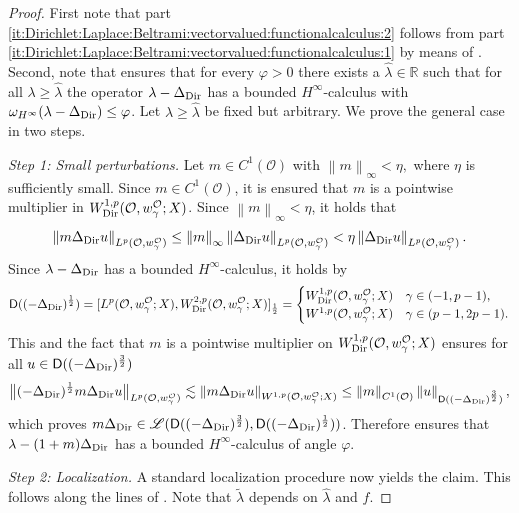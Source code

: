 \documentclass[12pt,a4paper, reqno]{amsart}
\theoremstyle{plain}
\theoremstyle{definition}
\theoremstyle{remark}
\numberwithin{equation}{section}
\newcommand{\1}{\mathbbm{1}}
\newcommand{\R}{\ensuremath{\mathbb{R}}}
\newcommand{\calO}{\ensuremath{\mathcal{O}}}
\newcommand{\sL}{\ensuremath{\mathscr{L}}}
\newcommand{\sfD}{\ensuremath{\mathsf{D}}}
\newcommand{\Dir}{\textup{Dir}}
\newcommand{\nrm}[1]{\left\lVert #1 \right\rVert}
\begin{document}
\begin{proof}
    First note that part \ref{it:Dirichlet:Laplace:Beltrami:vectorvalued:functionalcalculus:2} follows from part \ref{it:Dirichlet:Laplace:Beltrami:vectorvalued:functionalcalculus:1} by means of \cite[Theorem 13.1]{Kunstmann2004}. 
    Second, note that \cite[Theorem 6.1]{LindemulderVeraar2020} ensures that for every $\varphi>0$ there exists a $\hat\lambda\in \R$ such that for all $\lambda\ge \hat\lambda $ the operator $\lambda-\Delta_\Dir$ has a bounded $H^\infty$-calculus with $\omega_{H^\infty}(\lambda-\Delta_\Dir)\le \varphi$.
    Let $\lambda \ge \hat\lambda$ be fixed but arbitrary. 
    We prove the general case in two steps. 

\medskip

   \noindent\emph{Step 1: Small perturbations.} Let $m\in C^1(\calO)$ with $\nrm{m}_\infty<\eta,$ where $\eta$ is sufficiently small. Since $m\in C^1(\calO)$, it is ensured that $m$ is a pointwise multiplier in $W^{1,p}_\Dir(\calO,w_\gamma^\calO;X)$. Since $\nrm{m}_\infty<\eta$, it holds that \begin{equation}\label{Dirichlet:Laplace:Beltrami:vectorvalued:functionalcalculus:proof:1}
        \nrm{m\Delta_\Dir u}_{L^p(\calO,w_\gamma^\calO)}\le \nrm{m}_\infty \nrm{\Delta_\Dir u}_{L^p(\calO,w_\gamma^\calO)}< \eta\nrm{\Delta_\Dir u}_{L^p(\calO,w_\gamma^\calO)}. 
    \end{equation}
        Since $\lambda-\Delta_\Dir$ has a bounded $H^\infty$-calculus, it holds by \cite[Lemma 6.10]{LindemulderVeraar2020} 
        \[ \sfD((-\Delta_\Dir)^\frac{1}{2})=[L^p(\calO,w_\gamma^\calO;X),W^{2,p}_\Dir(\calO,w_\gamma^\calO;X)]_\frac{1}{2}= \begin{cases}
            W^{1,p}_\Dir(\calO,w_\gamma^\calO;X)& \gamma\in (-1,p-1),\\
            W^{1,p}(\calO,w_\gamma^\calO;X) & \gamma\in (p-1,2p-1).
        \end{cases}\]
        This and the fact that $m$ is a pointwise multiplier on $W^{1,p}_\Dir(\calO,w_\gamma^\calO;X)$ ensures for all $u\in \sfD((-\Delta_\Dir)^\frac{3}{2})$ \begin{equation}\label{Dirichlet:Laplace:Beltrami:vectorvalued:functionalcalculus:proof:2}
                \big\|(-\Delta_\Dir)^\frac{1}{2}m\Delta_\Dir u\big\|_{L^p(\calO,w_\gamma^\calO)}\lesssim \nrm{m\Delta_\Dir u}_{W^{1,p}(\calO,w_\gamma^\calO;X)}\le \nrm{m}_{C^1(\calO)}\nrm{u}_{\sfD((-\Delta_\Dir)^{\frac{3}{2}})},
        \end{equation}
        which proves $m\Delta_\Dir \in \sL(\sfD((-\Delta_\Dir)^\frac{3}{2}),\sfD((-\Delta_\Dir)^{\frac{1}{2}}))$. Therefore \cite[Theorem 3.2]{DenkDoreHieberPruesVenni_2004} ensures that $\lambda-(1+m)\Delta_\Dir$ has a bounded $H^\infty$-calculus of angle $\varphi$. 

\medskip

        \noindent\emph{Step 2: Localization.} A standard localization procedure now yields the claim. This follows along the lines of \cite[Section 6.6, Theorem 13.13]{Kunstmann2004}. Note that $\tilde\lambda$ depends on $\hat\lambda$ and $f$. 
 \end{proof}
\end{document}
